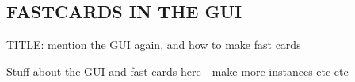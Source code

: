 \newpage
\subsection{FASTCARDS IN THE GUI}
\genHeader


TITLE: mention the GUI again, and how to make fast cards

Stuff about the GUI and fast cards here - make more instances etc etc
